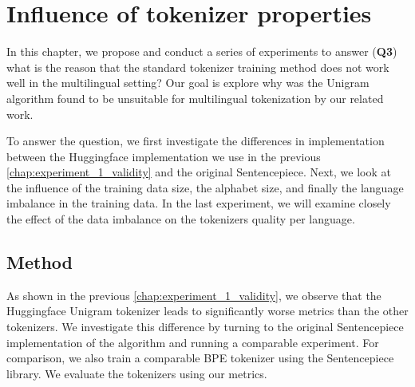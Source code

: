 \chapter{Influence of tokenizer properties}
\label{chap:experiment_2_properties}


In this chapter, we propose and conduct a series of experiments to answer (\textbf{Q3}) what is the reason that the standard tokenizer training method does not work well in the multilingual setting?
 Our goal is  explore why was the Unigram algorithm found to be unsuitable for multilingual tokenization by our related work.

To answer the question, we first investigate the differences in implementation between the Huggingface implementation we use in the previous \autoref{chap:experiment_1_validity} and the original Sentencepiece. Next, we look at the influence of the training data size, the alphabet size, and finally the language imbalance in the training data. In the last experiment, we will examine closely the effect of the data imbalance on the tokenizers quality per language.

\section{Method}

As shown in the previous \autoref{chap:experiment_1_validity}, we observe that the Huggingface Unigram tokenizer leads to significantly worse metrics than the other tokenizers.
 We investigate this difference by turning to the original Sentencepiece implementation of the algorithm and running a comparable experiment.
 For comparison, we also train a comparable BPE tokenizer using the Sentencepiece library. We evaluate the tokenizers using our metrics.


